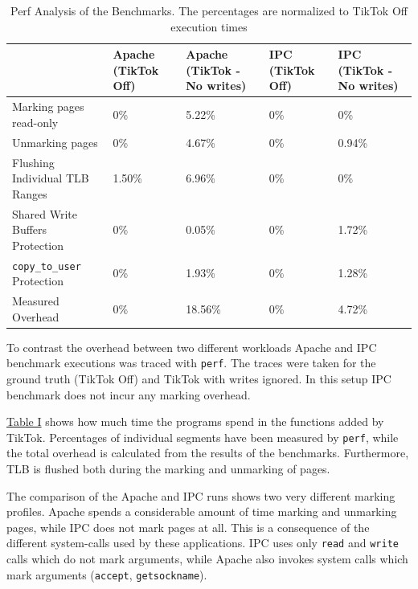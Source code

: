 \documentclass[conference]{IEEEtran}
\newcommand{\sysname}{TikTok}
\begin{document}
\begin{table}[]
  \label{perftable}
  \centering
  \begin{tabular}{|l|l|l|l|l|}
  \hline
                                     & Apache (\sysname{} Off) & Apache (\sysname{} - No writes) & IPC (\sysname{} Off) & IPC (\sysname{} - No writes)\\ \hline
  Marking pages read-only            & 0\%    & 5.22\%          & 0\% & 0\%         \\ \hline
  Unmarking pages                    & 0\%    & 4.67\%          & 0\% & 0.94\%      \\ \hline
  Flushing Individual TLB Ranges     & 1.50\% & 6.96\%          & 0\% & 0\%         \\ \hline
  Shared Write Buffers Protection    & 0\%    & 0.05\%          & 0\% & 1.72\%      \\ \hline
  \texttt{copy\_to\_user} Protection & 0\%    & 1.93\%          & 0\% & 1.28\%      \\ \hline
  Measured Overhead                  & 0\%    & 18.56\%         & 0\% & 4.72\%      \\ \hline
  \end{tabular}
  \caption{Perf Analysis of the Benchmarks. The percentages are normalized to \sysname{} Off execution times}
\end{table}

To contrast the overhead between two different workloads Apache and IPC
benchmark executions was traced with \texttt{perf}. The traces were taken for
the ground truth (\sysname{} Off) and \sysname{} with writes ignored. In this setup
IPC benchmark does not incur any marking overhead.

\hyperref[perftable]{Table I} shows how much time the programs spend in the functions
added by \sysname{}. Percentages of individual segments have been measured by
\texttt{perf}, while the total overhead is calculated from the results of the
benchmarks. Furthermore, TLB is flushed both during the marking and unmarking of
pages.

The comparison of the Apache and IPC runs shows two very different marking
profiles. Apache spends a considerable amount of time marking and unmarking
pages, while IPC does not mark pages at all. This is a consequence of the
different system-calls used by these applications. IPC uses only \texttt{read}
and \texttt{write} calls which do not mark arguments, while Apache also invokes
system calls which mark arguments (\texttt{accept}, \texttt{getsockname}).
\end{document}
